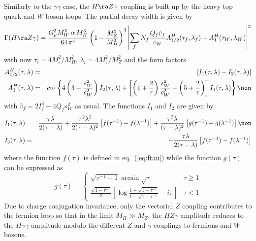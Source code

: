Similarly to the $\gamma \gamma$ case, the $H\ra Z\gamma$ coupling is built up 
by the heavy top quark and $W$ boson loops. The partial decay width is given by
\cite{Z-h-gamma1,Z-h-gamma2}
\begin{eqnarray}
\Gamma (H\ra Z\gamma ) = \frac{G^2_{\mu}M_W^2\, \alpha\,M_{H}^{3}} 
{64\,\pi^{4}} \left( 1-\frac{M_Z^2}{M_H^2} \right)^3 \left|
\sum_{f} N_{f} \frac{Q_f \hat{v}_f}{c_W} A_{1/2}^H(\tau_f,\lambda_f) + 
A^H_1(\tau_W,\lambda_W) \right|^2 
\label{eq:hzga}
\end{eqnarray}
with now $\tau_i= 4M_i^2/M_H^2$, $\lambda_i = 4M_i^2 /M_Z^2$ and the form 
factors
\begin{eqnarray}
A_{1/2}^H (\tau,\lambda) & = & \left[I_1(\tau,\lambda) - I_2(\tau,\lambda)
\right]  \\
A_1^H (\tau,\lambda) & = & c_W \left\{ 4\left(3-\frac{s_W^2}{c_W^2} \right)
I_2(\tau,\lambda) + \left[ \left(1+\frac{2}{\tau}\right) \frac{s_W^2}{c_W^2}
- \left(5+\frac{2}{\tau} \right) \right] I_1(\tau,\lambda) \right\} \non 
\label{eq:hzgaform}
\end{eqnarray}
with $\hat{v}_f=2I_f^3-4 Q_f s_W^2$ as usual. The functions $I_1$ and $I_2$ 
are given by
\begin{eqnarray}
I_1(\tau,\lambda) & = & \frac{\tau\lambda}{2(\tau-\lambda)}
+ \frac{\tau^2\lambda^2}{2(\tau-\lambda)^2} \left[ f(\tau^{-1})-f(\lambda^{-1}) 
\right] + \frac{\tau^2\lambda}{(\tau-\lambda)^2} \left[ g(\tau ^{-1}) - 
g(\lambda^{-1}) \right] \non \\
I_2(\tau,\lambda) & = & - \frac{\tau\lambda}{2(\tau-\lambda)}\left[ f(\tau
^{-1})- f(\lambda^{-1}) \right]
\end{eqnarray}
where the function $f(\tau)$ is defined in eq.~(\ref{eq:ftau}) while the 
function $g(\tau)$ can be expressed as
\begin{equation}
g(\tau) = \left\{ \begin{array}{ll}
\displaystyle \sqrt{\tau^{-1}-1} \arcsin \sqrt{\tau} & \tau \ge 1 \\
\displaystyle \frac{\sqrt{1-\tau^{-1}}}{2} \left[ \log \frac{1+\sqrt{1-\tau
^{-1}}}{1-\sqrt{1-\tau^{-1}}} - i\pi \right] & \tau  < 1
\end{array} \right.
\label{eq:gtau}
\end{equation}
Due to charge conjugation invariance, only the vectorial $Z$ coupling 
contributes to the fermion loop so that in the limit $M_H \gg M_Z$, the
$HZ\gamma$ amplitude reduces to the $H\gamma\gamma$ amplitude modulo
the different $Z$ and $\gamma$ couplings to fermions and $W$ bosons. \s

